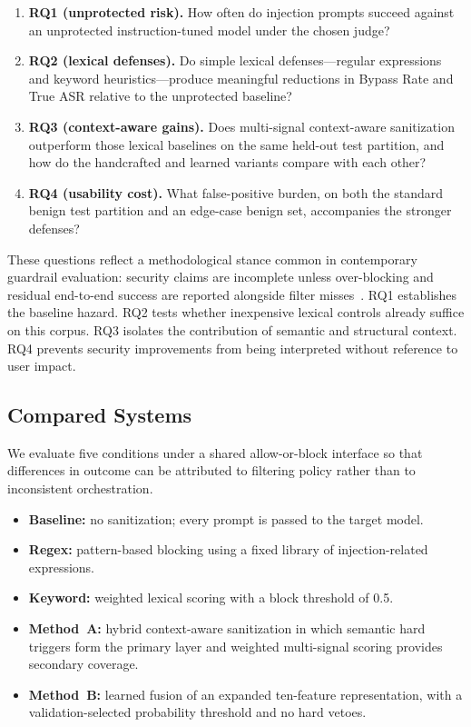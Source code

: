 ﻿\documentclass[10pt]{article}
\begin{document}
\begin{enumerate}
  \item \textbf{RQ1 (unprotected risk).}
    How often do injection prompts succeed against an unprotected instruction-tuned model under the chosen judge?
  \item \textbf{RQ2 (lexical defenses).}
    Do simple lexical defenses---regular expressions and keyword heuristics---produce meaningful reductions in Bypass Rate and True ASR relative to the unprotected baseline?
  \item \textbf{RQ3 (context-aware gains).}
    Does multi-signal context-aware sanitization outperform those lexical baselines on the same held-out test partition, and how do the handcrafted and learned variants compare with each other?
  \item \textbf{RQ4 (usability cost).}
    What false-positive burden, on both the standard benign test partition and an edge-case benign set, accompanies the stronger defenses?
\end{enumerate}

These questions reflect a methodological stance common in contemporary guardrail evaluation: security claims are incomplete unless over-blocking and residual end-to-end success are reported alongside filter misses~\cite{zizzo2025adversarial,promptfoo2024owasp,owasp_llm}.
RQ1 establishes the baseline hazard.
RQ2 tests whether inexpensive lexical controls already suffice on this corpus.
RQ3 isolates the contribution of semantic and structural context.
RQ4 prevents security improvements from being interpreted without reference to user impact.

\subsection{Compared Systems}
\label{sec:compared-systems}

We evaluate five conditions under a shared allow-or-block interface so that differences in outcome can be attributed to filtering policy rather than to inconsistent orchestration.

\begin{itemize}
  \item \textbf{Baseline:} no sanitization; every prompt is passed to the target model.
  \item \textbf{Regex:} pattern-based blocking using a fixed library of injection-related expressions.
  \item \textbf{Keyword:} weighted lexical scoring with a block threshold of 0.5.
  \item \textbf{Method~A:} hybrid context-aware sanitization in which semantic hard triggers form the primary layer and weighted multi-signal scoring provides secondary coverage.
  \item \textbf{Method~B:} learned fusion of an expanded ten-feature representation, with a validation-selected probability threshold and no hard vetoes.
\end{itemize}
\end{document}
